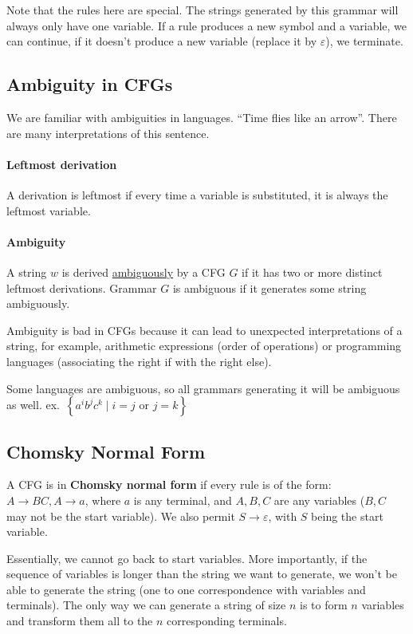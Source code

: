 \documentclass[12 pt]{article}
\begin{document}
Note that the rules here are special. The strings generated by this
grammar will always only have one variable. If a rule produces a new
symbol and a variable, we can continue, if it doesn't produce a new
variable (replace it by $\varepsilon$), we terminate.

\subsection{Ambiguity in CFGs}
We are familiar with ambiguities in languages. ``Time flies like an
arrow''. There are many interpretations of this sentence.

\paragraph{Leftmost derivation} A derivation is leftmost if every time
a variable is substituted, it is always the leftmost variable.

\paragraph{Ambiguity} A string $w$ is derived \underline{ambiguously}
by a CFG $G$ if it has two or more distinct leftmost
derivations. Grammar $G$ is ambiguous if it generates some string
ambiguously.

Ambiguity is bad in CFGs because it can lead to unexpected
interpretations of a string, for example, arithmetic expressions
(order of operations) or programming languages (associating the right
if with the right else).

Some languages are ambiguous, so all grammars generating it will be
ambiguous as well. ex.\ $\left\{a^ib^jc^k \mid i = j \text{ or } j =
  k\right\}$

\subsection{Chomsky Normal Form}
A CFG is in \textbf{Chomsky normal form} if every rule is of the form:
$A \to BC, A \to a$, where $a$ is any terminal, and $A, B, C$ are any
variables ($B,C$ may not be the start variable). We also permit $S \to
\varepsilon$, with $S$ being the start variable.

Essentially, we cannot go back to start variables. More importantly, if
the sequence of variables is longer than the string we want to
generate, we won't be able to generate the string (one to one
correspondence with variables and terminals). The only way we can
generate a string of size $n$ is to form $n$ variables and transform
them all to the $n$ corresponding terminals.
\end{document}
